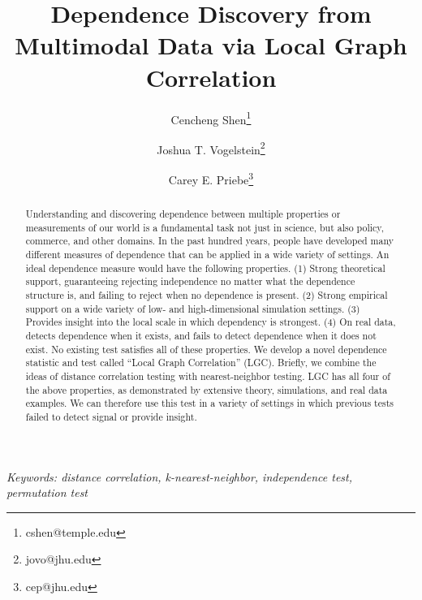 \documentclass[11pt]{article}
\begin{document}
\def\spacingset#1{\renewcommand{\baselinestretch}%
{#1}\small\normalsize} \spacingset{1}

\title{\bf Dependence Discovery from Multimodal Data via Local Graph Correlation}
\author[1]{Cencheng Shen\thanks{cshen@temple.edu}}
\author[2]{Joshua T. Vogelstein\thanks{jovo@jhu.edu}}
\author[3]{Carey E. Priebe\thanks{cep@jhu.edu}}
\maketitle
\pagestyle{empty}

\bigskip
\begin{abstract}
Understanding and discovering dependence between multiple properties or measurements of our world is a fundamental task not just in science, but also policy, commerce, and other domains. In the past hundred years, people have developed many different measures of dependence that can be applied in a wide variety of settings.  An ideal dependence measure would have the following properties. (1) Strong theoretical support, guaranteeing rejecting independence no matter what the dependence structure is, and failing to reject when no dependence is present. (2) Strong empirical support on a wide variety of low- and high-dimensional simulation settings. (3) Provides insight into the local scale in which dependency is strongest. (4) On real data, detects dependence when it exists, and fails to detect dependence when it does not exist. No existing test satisfies all of these properties. We develop a novel dependence statistic and test called ``Local Graph Correlation'' (LGC).  Briefly, we combine the ideas of distance correlation testing with nearest-neighbor testing.  LGC has all four of the above properties, as demonstrated by extensive theory, simulations, and real data examples. We can therefore use this test in a variety of settings in which previous tests failed to detect signal or provide insight.
\end{abstract}

\noindent%
{\it Keywords: distance correlation, k-nearest-neighbor, independence test, permutation test}  
\vfill

\clearpage
\tableofcontents


\newpage
\spacingset{1.45}
\end{document}
